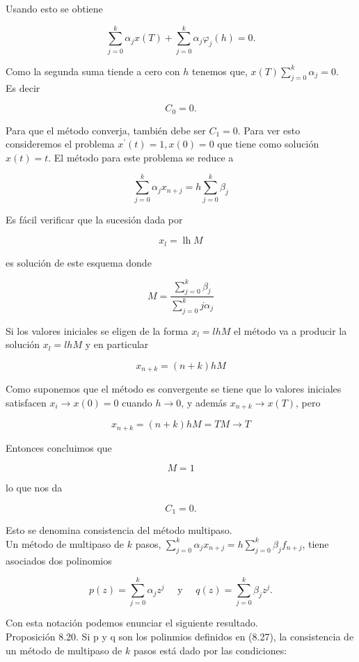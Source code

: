 \documentclass[10pt]{book}
\begin{document}
Usando esto se obtiene

$$
\sum_{j=0}^{k} \alpha_{j} x(T)+\sum_{j=0}^{k} \alpha_{j} \varphi_{j}(h)=0 .
$$

Como la segunda suma tiende a cero con $h$ tenemos que, $x(T) \sum_{j=0}^{k} \alpha_{j}=0$.\\
Es decir

$$
C_{0}=0 .
$$

Para que el método converja, también debe ser $C_{1}=0$. Para ver esto consideremos el problema $x^{\prime}(t)=1, x(0)=0$ que tiene como solución $x(t)=t$. El método para este problema se reduce a

$$
\sum_{j=0}^{k} \alpha_{j} x_{n+j}=h \sum_{j=0}^{k} \beta_{j}
$$

Es fácil verificar que la sucesión dada por

$$
x_{l}=\operatorname{lh} M
$$

es solución de este esquema donde

$$
M=\frac{\sum_{j=0}^{k} \beta_{j}}{\sum_{j=0}^{k} j \alpha_{j}}
$$

Si los valores iniciales se eligen de la forma $x_{l}=l h M$ el método va a producir la solución $x_{l}=l h M$ y en particular

$$
x_{n+k}=(n+k) h M
$$

Como suponemos que el método es convergente se tiene que lo valores iniciales satisfacen $x_{i} \rightarrow x(0)=0$ cuando $h \rightarrow 0$, y además $x_{n+k} \rightarrow x(T)$, pero

$$
x_{n+k}=(n+k) h M=T M \rightarrow T
$$

Entonces concluimos que

$$
M=1
$$

lo que nos da

$$
C_{1}=0 .
$$

Esto se denomina consistencia del método multipaso.\\
Un método de multipaso de $k$ pasos, $\sum_{j=0}^{k} \alpha_{j} x_{n+j}=h \sum_{j=0}^{k} \beta_{j} f_{n+j}$, tiene asociados dos polinomios


\begin{equation*}
p(z)=\sum_{j=0}^{k} \alpha_{j} z^{j} \quad \text { y } \quad q(z)=\sum_{j=0}^{k} \beta_{j} z^{j} . \tag{8.27}
\end{equation*}


Con esta notación podemos enunciar el siguiente resultado.\\
Proposición 8.20. Si p y q son los polinmios definidos en (8.27), la consistencia de un método de multipaso de $k$ pasos está dado por las condiciones:
\end{document}
